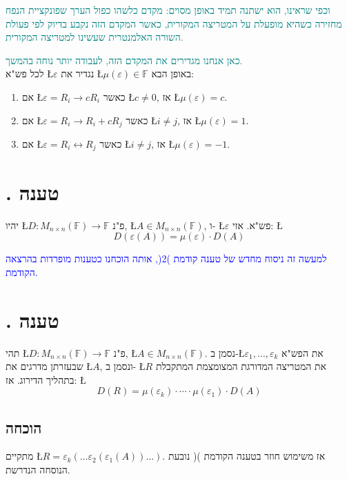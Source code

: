\documentclass[english,hebrew]{article}
\begin{document}
\textcolor{teal}{וכפי שראינו, הוא ישתנה תמיד באופן מסוים: מקדם כלשהו
כפול הערך שפונקציית הנפח מחזירה כשהיא מופעלת על המטריצה המקורית, כאשר
המקדם הזה נקבע בדיוק לפי פעולת השורה האלמנטרית שעשינו למטריצה המקורית.}

\textcolor{teal}{כאן אנחנו מגדירים את המקדם הזה, לעבודה יותר נוחה
בהמשך.}\\

לכל פש"א \L{$\varepsilon$} נגדיר את \L{$\mu(\varepsilon)\in\mathbb{F}$}
באופן הבא: 
\begin{enumerate}
\item אם \L{$\varepsilon=R_{i}\to cR_{i}$} כאשר \L{$c\neq0$}, אז \L{$\mu(\varepsilon)=c$}. 
\item אם \L{$\varepsilon=R_{i}\to R_{i}+cR_{j}$} כאשר \L{$i\neq j$}, אז
\L{$\mu(\varepsilon)=1$}. 
\item אם \L{$\varepsilon=R_{i}\leftrightarrow R_{j}$} כאשר \L{$i\neq j$},
אז \L{$\mu(\varepsilon)=-1$}. 
\end{enumerate}

\section{{\endL}. טענה}

יהיו \L{$D:M_{n\times n}(\mathbb{F})\to\mathbb{F}$} פ"נ, \L{$A\in M_{n\times n}(\mathbb{F})$},
ו- \L{$\varepsilon$} פש"א. אזי: \L{%
\[
D(\varepsilon(A))=\mu(\varepsilon)\cdot D(A)
\]
}%

\textcolor{blue}{למעשה זה ניסוח מחדש של טענה קודמת )2(, אותה הוכחנו
כטענות מופרדות בהרצאה הקודמת.}

\section{{\endL}. טענה}

תהי \L{$D:M_{n\times n}(\mathbb{F})\to\mathbb{F}$} פ"נ, \L{$A\in M_{n\times n}(\mathbb{F})$}.
נסמן ב-\L{$\varepsilon_{1},\dots,\varepsilon_{k}$} את הפש"א שבעזרתן
מדרגים את \L{$A$}, ונסמן ב- \L{$R$} את המטריצה המדורגת המצומצמת
המתקבלת בתהליך הדירוג. אז: \L{%
\[
D(R)=\mu(\varepsilon_{k})\cdot\cdots\cdot\mu(\varepsilon_{1})\cdot D(A)
\]
}%

\subsection{הוכחה}

מתקיים \L{$R=\varepsilon_{k}(\dots\varepsilon_{2}(\varepsilon_{1}(A))\dots)$}.
אז משימוש חוזר בטענה הקודמת ){\endL}( נובעת הנוסחה הנדרשת.
\end{document}
